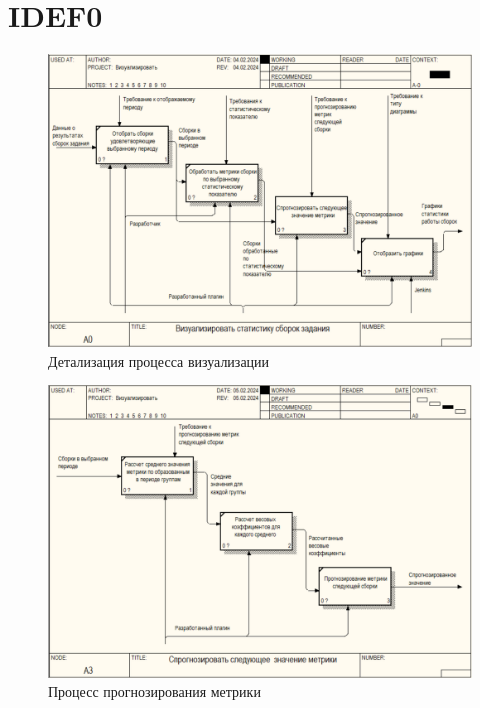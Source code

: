 \chapter{IDEF0}\label{appendix-extra-examples}

\begin{figure}[ht!] 
	\center
	\includegraphics [scale=0.6] {my_folder/images//er2}
	\caption{Детализация процесса визуализации} 
	\label{fig:er2}  
\end{figure}


\begin{figure}[ht!] 
	\center
	\includegraphics [scale=0.6] {my_folder/images//er3}
	\caption{Процесс прогнозирования метрики} 
	\label{fig:er3}  
\end{figure}


